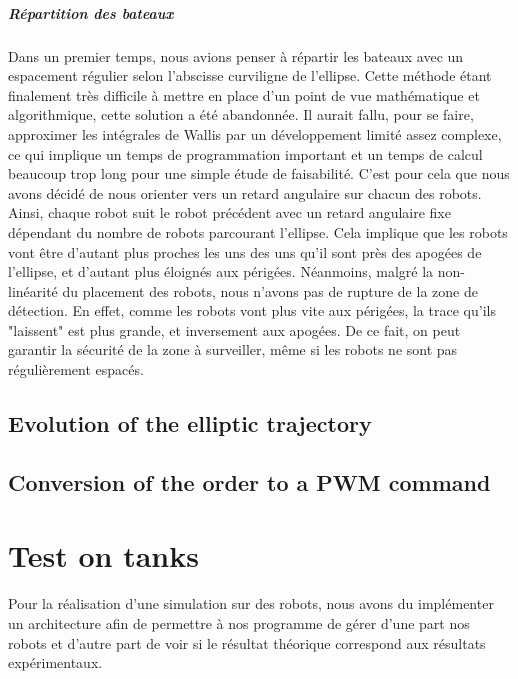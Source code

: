 \documentclass[10pt,a4paper]{report}
\begin{document}
\paragraph{Répartition des bateaux}
Dans un premier temps, nous avions penser à répartir les bateaux avec un espacement régulier selon l'abscisse curviligne de l'ellipse.
Cette méthode étant finalement très difficile à mettre en place d'un point de vue mathématique et algorithmique, cette solution a été abandonnée. Il aurait fallu, pour se faire, approximer les intégrales de Wallis par un développement limité assez complexe, ce qui implique un temps de programmation important et un temps de calcul beaucoup trop long pour une simple étude de faisabilité.
C'est pour cela que nous avons décidé de nous orienter vers un retard angulaire sur chacun des robots. Ainsi, chaque robot suit le robot précédent avec un retard angulaire fixe dépendant du nombre de robots parcourant l'ellipse. Cela implique que les robots vont être d'autant plus proches les uns des uns qu'il sont près des apogées de l'ellipse, et d'autant plus éloignés aux périgées.
Néanmoins, malgré la non-linéarité du placement des robots, nous n'avons pas de rupture de la zone de détection. En effet, comme les robots vont plus vite aux périgées, la trace qu'ils "laissent" est plus grande, et inversement aux apogées. De ce fait, on peut garantir la sécurité de la zone à surveiller, même si les robots ne sont pas régulièrement espacés.



\section{Evolution of the elliptic trajectory}



\section{Conversion of the order to a PWM command}





\chapter{Test on tanks}



Pour la réalisation d'une simulation sur des robots, nous avons du implémenter un architecture afin de permettre à nos programme de gérer d'une part nos robots et d'autre part de voir si le résultat théorique correspond aux résultats expérimentaux.
\end{document}
